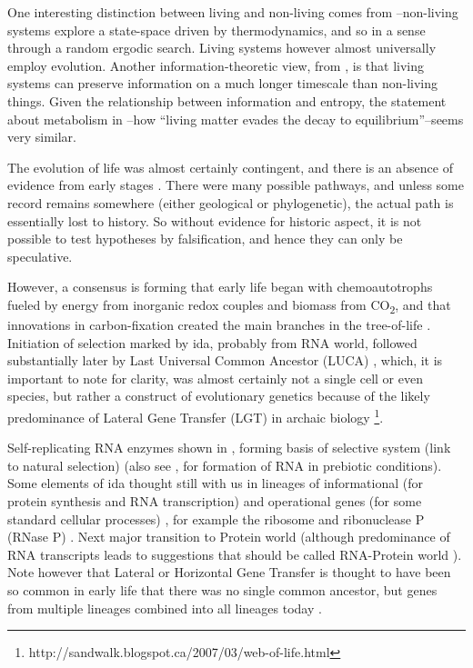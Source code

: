 One interesting distinction between living and non-living comes from \parencite{Rasmussen2004}--non-living systems explore a state-space driven by thermodynamics, and so in a sense through a random ergodic search. Living systems however almost universally employ evolution. Another information-theoretic view, from \parencite{Adami2015}, is that living systems can preserve information on a much longer timescale than non-living things. Given the relationship between information and entropy, the statement about metabolism in \textcite{Schrodinger1944}--how ``living matter evades the decay to equilibrium''--seems very similar.

\begin{mdframed}[style=box, frametitle={The orgins of life}]

The evolution of life was almost certainly contingent, and there is an absence of evidence from early stages \parencite{Pross2013}. There were many possible pathways, and unless some record remains somewhere (either geological or phylogenetic), the actual path is essentially lost to history. So without evidence for historic aspect, it is not possible to test hypotheses by falsification, and hence they can only be speculative.

However, a consensus is forming that early life began with chemoautotrophs fueled by energy from inorganic redox couples and biomass from CO\textsubscript{2}, and that innovations in carbon-fixation created the main branches in the tree-of-life \parencite{Braakman2012}. Initiation of selection marked by \gls{ida}, probably from RNA world, followed substantially later by Last Universal Common Ancestor (LUCA) \parencite{Yarus2011}, which, it is important to note for clarity, was almost certainly not a single cell or even species, but rather a construct of evolutionary genetics because of the likely predominance of Lateral Gene Transfer (LGT) in archaic biology \footnote{http://sandwalk.blogspot.ca/2007/03/web-of-life.html}.

Self-replicating RNA enzymes shown in \parencite{Lincoln2009}, forming basis of selective system (link to natural selection) (also see \parencite{Cheng2010}, \parencite{Powner2009} for formation of RNA in prebiotic conditions). Some elements of \gls{ida} thought still with us in lineages of informational (for protein synthesis and RNA transcription) and operational genes (for some standard cellular processes) \parencite{Ragan2009}, for example the ribosome and ribonuclease P (RNase P) \parencite{Wilson2009}. Next major transition to Protein world (although predominance of RNA transcripts leads to suggestions that should be called RNA-Protein world \parencite{Altman2013}). Note however that Lateral or Horizontal Gene Transfer is thought to have been so common in early life that there was no single common ancestor, but genes from multiple lineages combined into all lineages today \parencite{Ragan2009}.


\end{mdframed}
